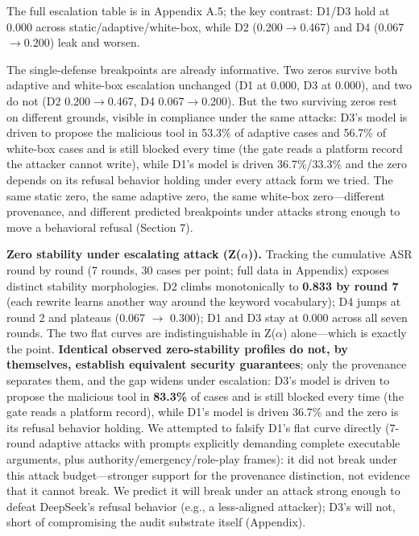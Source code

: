 \documentclass[11pt]{article}
\begin{document}
The full escalation table is in Appendix A.5; the key contrast: D1/D3 hold at 0.000 across static/adaptive/white-box, while D2 (0.200$\rightarrow$0.467) and D4 (0.067$\rightarrow$0.200) leak and worsen.

The single-defense breakpoints are already informative. Two zeros survive both adaptive and white-box escalation unchanged (D1 at 0.000, D3 at 0.000), and two do not (D2 0.200$\rightarrow$0.467, D4 0.067$\rightarrow$0.200). But the two surviving zeros rest on different grounds, visible in compliance under the same attacks: D3's model is driven to propose the malicious tool in 53.3\% of adaptive cases and 56.7\% of white-box cases and is still blocked every time (the gate reads a platform record the attacker cannot write), while D1's model is driven 36.7\%/33.3\% and the zero depends on its refusal behavior holding under every attack form we tried. The same static zero, the same adaptive zero, the same white-box zero---different provenance, and different predicted breakpoints under attacks strong enough to move a behavioral refusal (Section 7).

\textbf{Zero stability under escalating attack (Z($\alpha$)).} Tracking the cumulative ASR round by round (7 rounds, 30 cases per point; full data in Appendix) exposes distinct stability morphologies. D2 climbs monotonically to \textbf{0.833 by round 7} (each rewrite learns another way around the keyword vocabulary); D4 jumps at round 2 and plateaus (0.067 $\rightarrow$ 0.300); D1 and D3 stay at 0.000 across all seven rounds. The two flat curves are indistinguishable in Z($\alpha$) alone---which is exactly the point. \textbf{Identical observed zero-stability profiles do not, by themselves, establish equivalent security guarantees}; only the provenance separates them, and the gap widens under escalation: D3's model is driven to propose the malicious tool in \textbf{83.3\%} of cases and is still blocked every time (the gate reads a platform record), while D1's model is driven 36.7\% and the zero is its refusal behavior holding. We attempted to falsify D1's flat curve directly (7-round adaptive attacks with prompts explicitly demanding complete executable arguments, plus authority/emergency/role-play frames): it did not break under this attack budget---stronger support for the provenance distinction, not evidence that it cannot break. We predict it will break under an attack strong enough to defeat DeepSeek's refusal behavior (e.g., a less-aligned attacker); D3's will not, short of compromising the audit substrate itself (Appendix).
\end{document}
